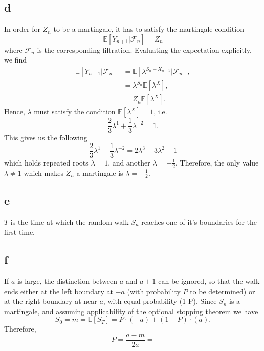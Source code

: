 \documentclass{article}
\begin{document}
\subsection{d}
In order for $Z_n$ to be a martingale, it has to satisfy the martingale condition
\begin{equation}
    \mathbb{E}[Y_{n+1}\vert \mathcal{F}_n] = Z_n
\end{equation}
where $\mathcal{F}_n$ is the corresponding filtration. Evaluating the expectation explicitly, we find 
\begin{align}
    \mathbb{E}[Y_{n+1}\vert \mathcal{F}_n] &= \mathbb{E}[\lambda^{S_n+X_{n+1}}\vert \mathcal{F}_n],\\
    &= \lambda^{S_n}\mathbb{E}[\lambda^X],\\
    &= Z_n\mathbb{E}[\lambda^X].
\end{align}
Hence, $\lambda$ must satisfy the condition $\mathbb{E}[\lambda^X] = 1$, i.e.
\begin{equation}
    \frac{2}{3}\lambda^1 + \frac{1}{3}\lambda^{-2} = 1.
\end{equation}
This gives us the following
\begin{equation}
   \frac{2}{3}\lambda^1 + \frac{1}{3}\lambda^{-2} = 2\lambda^3 - 3\lambda^2 + 1
\end{equation}
which holds repeated roots $\lambda=1$, and another $\lambda=-\frac{1}{2}$. Therefore, the only value $\lambda\neq 1$ which makes $Z_n$ a martingale is $\lambda = -\frac{1}{2}$.

\subsection{e}
$T$ is the time at which the random walk $S_n$ reaches one of it's boundaries for the first time.

\subsection{f}
If $a$ is large, the distinction between $a$ and $a+1$ can be ignored, so that the walk ends either at the left boundary at $-a$ (with probability $P$ to be determined) or at the right boundary at near $a$, with equal probability (1-P). Since $S_n$ is a martingale, and assuming applicability of the optional stopping theorem we have
\begin{equation}
    S_0 = m = \mathbb{E}[S_T] = P\cdot (-a) + (1-P)\cdot (a).
\end{equation}
Therefore, 
\begin{equation}
    P = \frac{a-m}{2a} = 
\end{equation}
\end{document}

